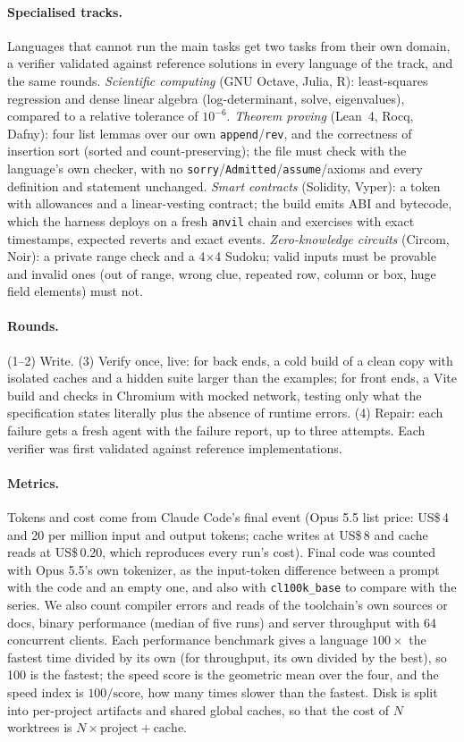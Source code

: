 \documentclass[11pt,a4paper]{article}
\begin{document}
\paragraph{Specialised tracks.} Languages that cannot run the main tasks get two tasks from their own
domain, a verifier validated against reference solutions in every language of the track, and the same
rounds. \emph{Scientific computing} (GNU Octave, Julia, R): least-squares regression and dense linear
algebra (log-determinant, solve, eigenvalues), compared to a relative tolerance of $10^{-6}$.
\emph{Theorem proving} (Lean~4, Rocq, Dafny): four list lemmas over our own \texttt{append}/\texttt{rev},
and the correctness of insertion sort (sorted and count-preserving); the file must check with the
language's own checker, with no \texttt{sorry}/\texttt{Admitted}/\texttt{assume}/axioms and every
definition and statement unchanged. \emph{Smart contracts} (Solidity, Vyper): a token with allowances
and a linear-vesting contract; the build emits ABI and bytecode, which the harness deploys on a fresh
\texttt{anvil} chain and exercises with exact timestamps, expected reverts and exact events.
\emph{Zero-knowledge circuits} (Circom, Noir): a private range check and a 4$\times$4 Sudoku; valid inputs
must be provable and invalid ones (out of range, wrong clue, repeated row, column or box, huge field
elements) must not.

\paragraph{Rounds.} (1--2) Write. (3) Verify once, live: for back ends, a cold build of a clean copy with
isolated caches and a hidden suite larger than the examples; for front ends, a Vite build and checks in
Chromium with mocked network, testing only what the specification states literally plus the absence of
runtime errors. (4) Repair: each failure gets a fresh agent with the failure report, up to three
attempts. Each verifier was first validated against reference implementations.

\paragraph{Metrics.} Tokens and cost come from Claude Code's final event (Opus 5.5 list price: US\$\,4
and 20 per million input and output tokens; cache writes at US\$\,8 and cache reads at US\$\,0.20, which
reproduces every run's cost). Final code was counted with Opus 5.5's own
tokenizer, as the input-token difference between a prompt with the code and an empty one, and also with
\texttt{cl100k\_base} to compare with the series. We also count compiler errors and reads of the
toolchain's own sources or docs, binary performance (median of five runs) and server throughput with 64
concurrent clients. Each performance benchmark gives a language $100 \times$ the fastest time divided
by its own (for throughput, its own divided by the best), so 100 is the fastest; the speed score is the
geometric mean over the four, and the speed index is $100 / \mathrm{score}$, how many times slower than
the fastest. Disk is split into per-project artifacts and shared global caches, so that the cost
of $N$ worktrees is $N \times \mathrm{project} + \mathrm{cache}$.
\end{document}
